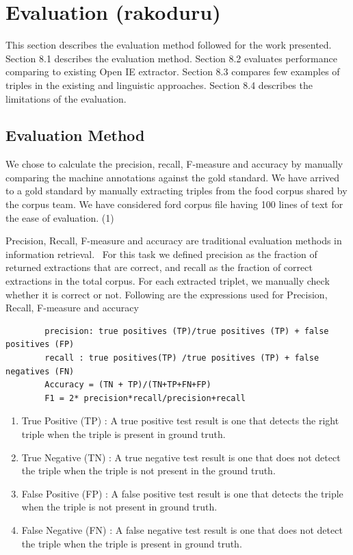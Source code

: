 \documentclass[11pt,letterpaper]{article}
\begin{document}
\section{Evaluation (rakoduru)}

This section describes the evaluation method followed for the work presented. Section 8.1 describes the evaluation method. Section 8.2 evaluates performance comparing to existing Open IE extractor. Section 8.3 compares few examples of triples in the existing and linguistic approaches. Section 8.4 describes the limitations of the evaluation.

\subsection{Evaluation Method}

We chose to calculate the precision, recall, F-measure and accuracy by manually comparing the machine annotations against the gold standard. We have arrived to a gold standard by manually extracting triples from the food corpus shared by the corpus team. We have considered ford corpus file having 100 lines of text for the ease of evaluation. (1)

Precision, Recall, F-measure and accuracy are traditional evaluation methods in information retrieval.~\cite{precision} 
For this task we defined precision as the fraction of returned extractions that are correct, and recall as the fraction of correct extractions in the total corpus. For each extracted triplet, we manually check whether it is correct or not. Following are the expressions used for Precision, Recall, F-measure and accuracy
    \begin{verbatim}
        precision: true positives (TP)/true positives (TP) + false positives (FP)
        recall : true positives(TP) /true positives (TP) + false negatives (FN)
        Accuracy = (TN + TP)/(TN+TP+FN+FP) 
        F1 = 2* precision*recall/precision+recall
    \end{verbatim}
\begin{enumerate}
    \item True Positive (TP) : A true positive test result is one that detects the right triple  when the triple is present in ground truth.
    \item True Negative (TN) : A true negative test result is one that does not detect the triple when the triple is not present in the ground truth.
    \item False Positive (FP) : A false positive test result is one that detects the triple when the triple is not present in ground truth.
    \item False Negative (FN) : A false negative test result is one that does not detect the triple when the triple is present in ground truth.
\end{enumerate}
\end{document}

